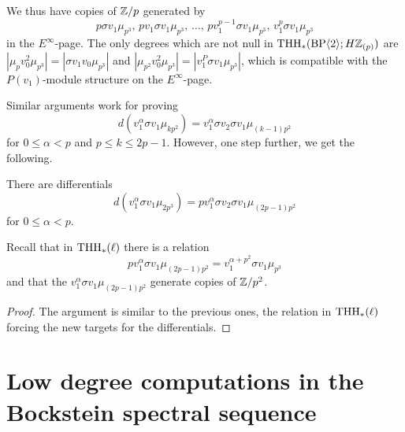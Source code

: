 \begin{remark}
  We thus have copies of $\mathbb{Z}/p$ generated by
  \begin{equation}
    p\sigma v_1 \mu_{p^3},\, p v_1 \sigma v_1 \mu_{p^3},\, \dots,\, p v_1^{p-1} \sigma v_1 \mu_{p^3},\, v_1^p \sigma v_1 \mu_{p^3}
  \end{equation}
  in the $E^\infty$-page. The only degrees which are not null in $\operatorname{THH}_*(\mathrm{BP} \langle 2 \rangle; H \mathbb{Z}_{(p)})$ are $|\mu_p v_0^2 \mu_{p^3}| = |\sigma v_1 v_0 \mu_{p^3}|$ and $|\mu_{p^2} v_0^2 \mu_{p^3}| = |v_1^P \sigma v_1 \mu_{p^3}|$, which is compatible with the $P(v_1)$-module structure on the $E^\infty$-page.
\end{remark}

Similar arguments work for proving
\begin{equation}
  d(v_1^\alpha \sigma v_1 \mu_{k p^2}) = v_1^\alpha \sigma v_2 \sigma v_1 \mu_{(k-1)p^2}
\end{equation}
for $0 \leq \alpha < p$ and $p \leq k \leq 2p - 1$. However, one step further, we get the following.

\begin{proposition}
  There are differentials
  \begin{equation}
    d(v_1^\alpha \sigma v_1 \mu_{2 p^3}) = p v_1^\alpha \sigma v_2 \sigma v_1 \mu_{(2p-1)p^2}
  \end{equation}
  for $0 \leq \alpha < p$.

  Recall that in $\operatorname{THH}_*(\ell)$ there is a relation
  \begin{equation}
    p v_1^\alpha \sigma v_1 \mu_{(2p-1)p^2} = v_1^{\alpha + p^2} \sigma v_1 \mu_{p^3}
  \end{equation}
  and that the $v_1^\alpha \sigma v_1 \mu_{(2p-1)p^2}$ generate copies of $\mathbb{Z}/p^2$.
\end{proposition}

\begin{proof}
  The argument is similar to the previous ones, the relation in $\operatorname{THH}_*(\ell)$ forcing the new targets for the differentials.
\end{proof}

\section{Low degree computations in the Bockstein spectral sequence}


